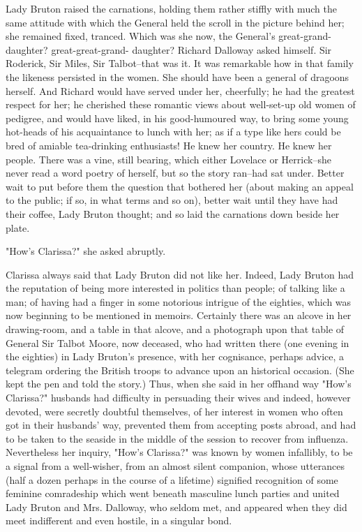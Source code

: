 \documentclass[lang=cn,10pt]{elegantbook}
\begin{document}
Lady Bruton raised the carnations, holding them rather stiffly with
much the same attitude with which the General held the scroll in
the picture behind her; she remained fixed, tranced.  Which was she
now, the General's great-grand-daughter? great-great-grand-
daughter? Richard Dalloway asked himself.  Sir Roderick, Sir Miles,
Sir Talbot--that was it.  It was remarkable how in that family the
likeness persisted in the women.  She should have been a general of
dragoons herself.  And Richard would have served under her,
cheerfully; he had the greatest respect for her; he cherished these
romantic views about well-set-up old women of pedigree, and would
have liked, in his good-humoured way, to bring some young hot-heads
of his acquaintance to lunch with her; as if a type like hers could
be bred of amiable tea-drinking enthusiasts!  He knew her country.
He knew her people.  There was a vine, still bearing, which either
Lovelace or Herrick--she never read a word poetry of herself, but
so the story ran--had sat under.  Better wait to put before them
the question that bothered her (about making an appeal to the
public; if so, in what terms and so on), better wait until they
have had their coffee, Lady Bruton thought; and so laid the
carnations down beside her plate.

"How's Clarissa?" she asked abruptly.

Clarissa always said that Lady Bruton did not like her.  Indeed,
Lady Bruton had the reputation of being more interested in politics
than people; of talking like a man; of having had a finger in some
notorious intrigue of the eighties, which was now beginning to be
mentioned in memoirs.  Certainly there was an alcove in her
drawing-room, and a table in that alcove, and a photograph upon
that table of General Sir Talbot Moore, now deceased, who had
written there (one evening in the eighties) in Lady Bruton's
presence, with her cognisance, perhaps advice, a telegram ordering
the British troops to advance upon an historical occasion.  (She
kept the pen and told the story.)  Thus, when she said in her
offhand way "How's Clarissa?" husbands had difficulty in persuading
their wives and indeed, however devoted, were secretly doubtful
themselves, of her interest in women who often got in their
husbands' way, prevented them from accepting posts abroad, and had
to be taken to the seaside in the middle of the session to recover
from influenza.  Nevertheless her inquiry, "How's Clarissa?" was
known by women infallibly, to be a signal from a well-wisher, from
an almost silent companion, whose utterances (half a dozen perhaps
in the course of a lifetime) signified recognition of some feminine
comradeship which went beneath masculine lunch parties and united
Lady Bruton and Mrs. Dalloway, who seldom met, and appeared when
they did meet indifferent and even hostile, in a singular bond.
\end{document}
